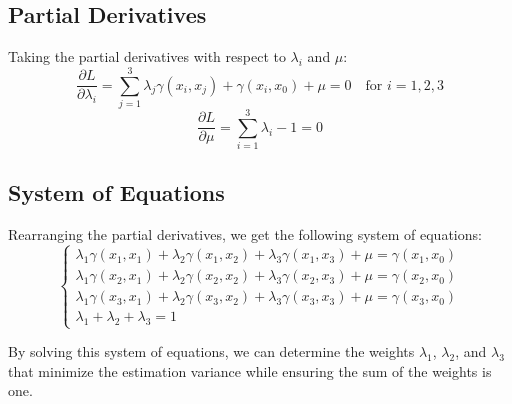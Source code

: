 \documentclass{article}
\begin{document}
\newpage
\subsection*{Partial Derivatives}
Taking the partial derivatives with respect to \( \lambda_i \) and \( \mu \):
\[
\frac{\partial L}{\partial \lambda_i} = \sum_{j=1}^{3} \lambda_j \gamma(x_i, x_j) + \gamma(x_i, x_0) + \mu = 0 \quad \text{for } i = 1, 2, 3
\]
\[
\frac{\partial L}{\partial \mu} = \sum_{i=1}^{3} \lambda_i - 1 = 0
\]

\subsection*{System of Equations}
Rearranging the partial derivatives, we get the following system of equations:
\[
\begin{cases}
\lambda_1 \gamma(x_1, x_1) + \lambda_2 \gamma(x_1, x_2) + \lambda_3 \gamma(x_1, x_3) + \mu = \gamma(x_1, x_0) \\
\lambda_1 \gamma(x_2, x_1) + \lambda_2 \gamma(x_2, x_2) + \lambda_3 \gamma(x_2, x_3) + \mu = \gamma(x_2, x_0) \\
\lambda_1 \gamma(x_3, x_1) + \lambda_2 \gamma(x_3, x_2) + \lambda_3 \gamma(x_3, x_3) + \mu = \gamma(x_3, x_0) \\
\lambda_1 + \lambda_2 + \lambda_3 = 1
\end{cases}
\]

By solving this system of equations, we can determine the weights \( \lambda_1 \), \( \lambda_2 \), and \( \lambda_3 \) that minimize the estimation variance while ensuring the sum of the weights is one.
\end{document}
